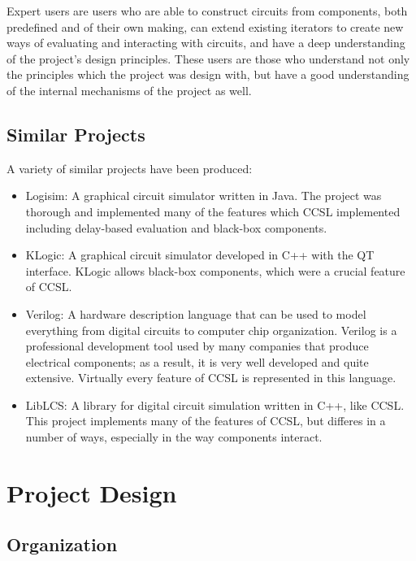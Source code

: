 \documentclass{article}
\begin{document}
Expert users are users who are able to construct circuits from components, both predefined and of their own making, can extend existing iterators to create new ways of evaluating and interacting with circuits, and have a deep understanding of the project's design principles. These users are those who understand not only the principles which the project was design with, but have a good understanding of the internal mechanisms of the project as well.

\subsection{Similar Projects}

A variety of similar projects have been produced:

\begin{itemize}

\item Logisim: A graphical circuit simulator written in Java. The project was thorough and implemented many of the features which CCSL implemented including delay-based evaluation and black-box components.\cite{Logisim}

\item KLogic: A graphical circuit simulator developed in C++ with the QT interface. KLogic allows black-box components, which were a crucial feature of CCSL.\cite{KLogic}

\item Verilog: A hardware description language that can be used to model everything from digital circuits to computer chip organization. Verilog is a professional development tool used by many companies that produce electrical components; as a result, it is very well developed and quite extensive. Virtually every feature of CCSL is represented in this language.\cite{Verilog}

\item LibLCS: A library for digital circuit simulation written in C++, like CCSL. This project implements many of the features of CCSL, but differes in a number of ways, especially in the way components interact.\cite{libLCS}

\end{itemize}

\section{Project Design}

\subsection{Organization}
\end{document}

